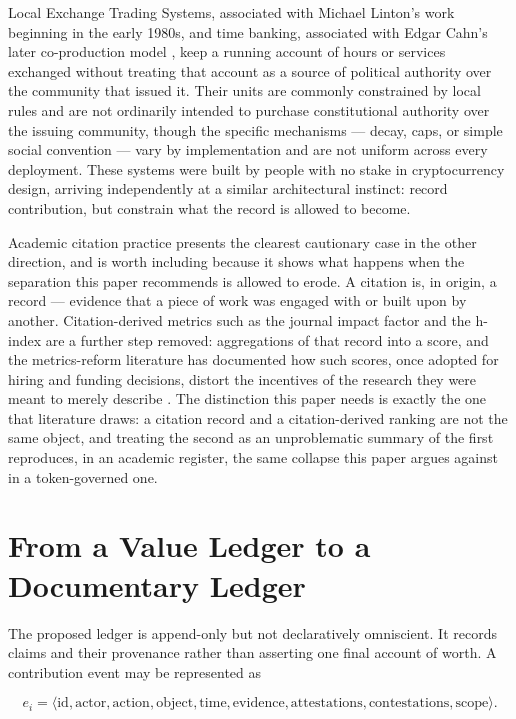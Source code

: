 \documentclass[11pt,oneside]{article}
\theoremstyle{plain}
\theoremstyle{definition}
\begin{document}
Local Exchange Trading Systems, associated with Michael Linton's work beginning in the early 1980s, and time banking, associated with Edgar Cahn's later co-production model \cite{cahn2000}, keep a running account of hours or services exchanged without treating that account as a source of political authority over the community that issued it. Their units are commonly constrained by local rules and are not ordinarily intended to purchase constitutional authority over the issuing community, though the specific mechanisms --- decay, caps, or simple social convention --- vary by implementation and are not uniform across every deployment. These systems were built by people with no stake in cryptocurrency design, arriving independently at a similar architectural instinct: record contribution, but constrain what the record is allowed to become.

Academic citation practice presents the clearest cautionary case in the other direction, and is worth including because it shows what happens when the separation this paper recommends is allowed to erode. A citation is, in origin, a record --- evidence that a piece of work was engaged with or built upon by another. Citation-derived metrics such as the journal impact factor and the h-index are a further step removed: aggregations of that record into a score, and the metrics-reform literature has documented how such scores, once adopted for hiring and funding decisions, distort the incentives of the research they were meant to merely describe \cite{hicks2015}. The distinction this paper needs is exactly the one that literature draws: a citation record and a citation-derived ranking are not the same object, and treating the second as an unproblematic summary of the first reproduces, in an academic register, the same collapse this paper argues against in a token-governed one.

\section{From a Value Ledger to a Documentary Ledger}

The proposed ledger is append-only but not declaratively omniscient. It records claims and their provenance rather than asserting one final account of worth. A contribution event may be represented as

\begin{equation}
e_i = \langle \mathrm{id},\mathrm{actor},\mathrm{action},\mathrm{object},\mathrm{time},
\mathrm{evidence},\mathrm{attestations},\mathrm{contestations},\mathrm{scope}\rangle.
\end{equation}
\end{document}
